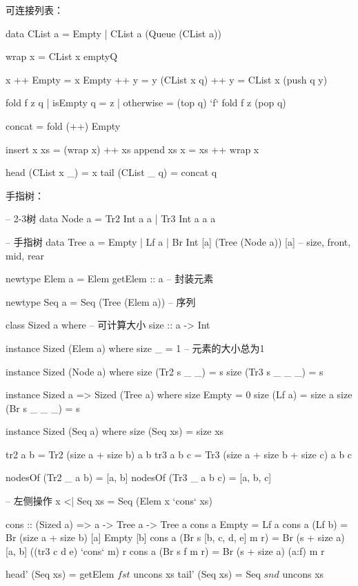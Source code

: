 \documentclass[b5paper]{ctexart}
\begin{document}
可连接列表：

\begin{Haskell}
data CList a = Empty | CList a (Queue (CList a))

wrap x = CList x emptyQ

x ++ Empty = x
Empty ++ y = y
(CList x q) ++ y = CList x (push q y)

fold f z q | isEmpty q = z
           | otherwise = (top q) `f` fold f z (pop q)

concat = fold (++) Empty

insert x xs = (wrap x) ++ xs
append xs x = xs ++ wrap x

head (CList x _) = x
tail (CList _ q) = concat q
\end{Haskell}

手指树：

\begin{Haskell}
-- 2-3树
data Node a = Tr2 Int a a
            | Tr3 Int a a a

-- 手指树
data Tree a = Empty
            | Lf a
            | Br Int [a] (Tree (Node a)) [a] -- size, front, mid, rear

newtype Elem a = Elem { getElem :: a } -- 封装元素

newtype Seq a = Seq (Tree (Elem a)) -- 序列

class Sized a where  -- 可计算大小
  size :: a -> Int

instance Sized (Elem a) where
  size _ = 1  -- 元素的大小总为1

instance Sized (Node a) where
  size (Tr2 s _ _) = s
  size (Tr3 s _ _ _) = s

instance Sized a => Sized (Tree a) where
  size Empty = 0
  size (Lf a) = size a
  size (Br s _ _ _) = s

instance Sized (Seq a) where
  size (Seq xs) = size xs

tr2 a b = Tr2 (size a + size b) a b
tr3 a b c = Tr3 (size a + size b + size c) a b c

nodesOf (Tr2 _ a b) = [a, b]
nodesOf (Tr3 _ a b c) = [a, b, c]

-- 左侧操作
x <| Seq xs = Seq (Elem x `cons` xs)

cons :: (Sized a) => a -> Tree a -> Tree a
cons a Empty = Lf a
cons a (Lf b) = Br (size a + size b) [a] Empty [b]
cons a (Br s [b, c, d, e] m r) = Br (s + size a) [a, b] ((tr3 c d e) `cons` m) r
cons a (Br s f m r) = Br (s + size a) (a:f) m r

head' (Seq xs) = getElem $ fst $ uncons xs
tail' (Seq xs) = Seq $ snd $ uncons xs


\end{Haskell}
\end{document}
